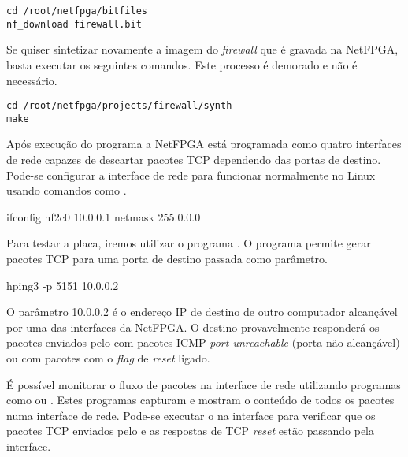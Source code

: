 \begin{verbatim}
cd /root/netfpga/bitfiles
nf_download firewall.bit
\end{verbatim}

Se quiser sintetizar novamente a imagem do \emph{firewall} que é
gravada na NetFPGA, basta executar os seguintes comandos.  Este
processo é demorado e não é necessário.

\begin{verbatim}
cd /root/netfpga/projects/firewall/synth
make
\end{verbatim}

Após execução do programa  a NetFPGA está
programada como quatro interfaces de rede capazes de descartar
pacotes TCP dependendo das portas de destino.  Pode-se configurar a
interface de rede para funcionar normalmente no Linux usando
comandos como .

\begin{verbnobox}[\small]
ifconfig nf2c0 10.0.0.1 netmask 255.0.0.0
\end{verbnobox}

Para testar a placa, iremos utilizar o programa .  O
programa  permite gerar pacotes TCP para uma porta de
destino passada como parâmetro.

\begin{verbnobox}[\small]
hping3 -p 5151 10.0.0.2
\end{verbnobox}

O parâmetro 10.0.0.2 é o endereço IP de destino de outro computador
alcançável por uma das interfaces da NetFPGA.  O destino
provavelmente responderá os pacotes enviados pelo  com
pacotes ICMP \emph{port unreachable} (porta não alcançável) ou com
pacotes com o \emph{flag} de \emph{reset} ligado.\footnotemark{}


É possível monitorar o fluxo de pacotes na interface de rede
utilizando programas como  ou .  Estes
programas capturam e mostram o conteúdo de todos os pacotes numa
interface de rede.  Pode-se executar o  na interface
 para verificar que os pacotes TCP enviados pelo
 e as respostas de TCP \emph{reset} estão passando pela
interface.

